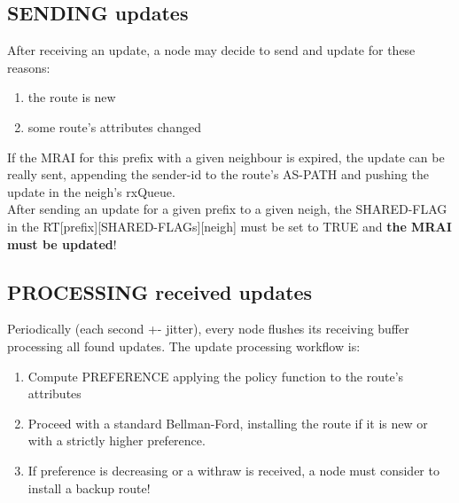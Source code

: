 \documentclass[fleqn,10pt]{SelfArx} %
\begin{document}
\subsection*{SENDING updates}
After receiving an update, a node may decide to send and update for these reasons:
\begin{enumerate}[noitemsep]
  \item the route is new
  \item some route's attributes changed
\end{enumerate}
If the MRAI for this prefix with a given neighbour is expired, the update can be really sent, appending the sender-id to the route's AS-PATH and pushing the update in the neigh's rxQueue.\\
After sending an update for a given prefix to a given neigh, the SHARED-FLAG in the RT[prefix][SHARED-FLAGs][neigh] must be set to TRUE and \textbf{the MRAI must be updated}!

\subsection*{PROCESSING received updates}
Periodically (each second +- jitter), every node flushes its receiving buffer processing all found updates. The update processing workflow is:
\begin{enumerate}[noitemsep]
  \item Compute PREFERENCE applying the policy function to the route's attributes
  \item Proceed with a standard Bellman-Ford, installing the route if it is new or with a strictly higher preference.
  \item If preference is decreasing or a withraw is received, a node must consider to install a backup route!
\end{enumerate}











\end{document}

